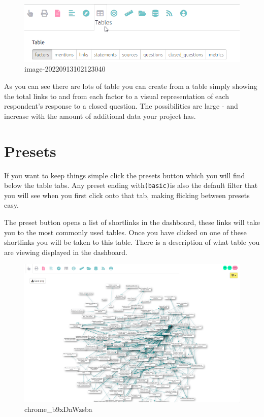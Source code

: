 \documentclass[
]{book}
\begin{document}
\begin{figure}
\centering
\includegraphics[width=6.77083in,height=\textheight]{_assets/image-20220913102123040.png}
\caption{image-20220913102123040}
\end{figure}

As you can see there are lots of table you can create from a table simply showing the total links to and from each factor to a visual representation of each respondent's response to a closed question. The possibilities are large - and increase with the amount of additional data your project has.

\hypertarget{preset-tables}{%
\section{Presets}\label{preset-tables}}

If you want to keep things simple click the presets button which you will find below the table tabs. Any preset ending with\texttt{(basic)}is also the default filter that you will see when you first click onto that tab, making flicking between presets easy.

The preset button opens a list of shortlinks in the dashboard, these links will take you to the most commonly used tables. Once you have clicked on one of these shortlinks you will be taken to this table. There is a description of what table you are viewing displayed in the dashboard.

\begin{figure}
\centering
\includegraphics[width=6.77083in,height=\textheight]{_assets/chrome_b9xDnWzsba.gif}
\caption{chrome\_b9xDnWzsba}
\end{figure}
\end{document}
